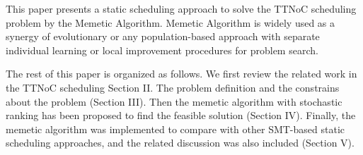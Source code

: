\documentclass[conference]{IEEEtran}
\begin{document}
This paper presents a static scheduling approach to solve the TTNoC scheduling problem by the Memetic Algorithm. Memetic Algorithm is widely used as a synergy of evolutionary or any population-based approach with separate individual learning or local improvement procedures for problem search. 

The rest of this paper is organized as follows. We first review the related work in the TTNoC scheduling Section II. The problem definition and the constrains about the problem (Section III). Then the memetic algorithm with stochastic ranking has been proposed to find the feasible solution (Section IV). Finally, the memetic algorithm was implemented to compare with other SMT-based static scheduling approaches, and the related discussion was also included (Section V).

%
%

\end{document}
